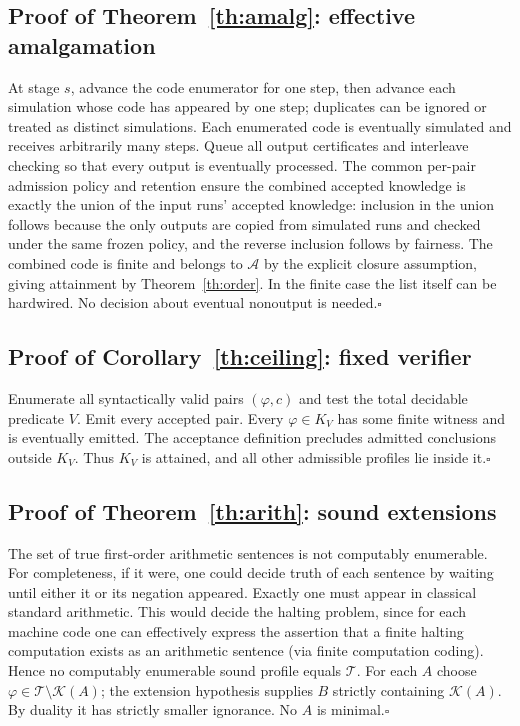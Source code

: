 \documentclass[11pt]{article}
\newcommand{\T}{\mathcal T}\newcommand{\K}{\mathcal K}\newcommand{\I}{\mathcal I}\newcommand{\A}{\mathcal A}
\begin{document}
\subsection{Proof of Theorem~\ref{th:amalg}: effective amalgamation}
At stage $s$, advance the code enumerator for one step, then advance each simulation whose code has appeared by one step; duplicates can be ignored or treated as distinct simulations. Each enumerated code is eventually simulated and receives arbitrarily many steps. Queue all output certificates and interleave checking so that every output is eventually processed. The common per-pair admission policy and retention ensure the combined accepted knowledge is exactly the union of the input runs' accepted knowledge: inclusion in the union follows because the only outputs are copied from simulated runs and checked under the same frozen policy, and the reverse inclusion follows by fairness. The combined code is finite and belongs to $\A$ by the explicit closure assumption, giving attainment by Theorem~\ref{th:order}. In the finite case the list itself can be hardwired. No decision about eventual nonoutput is needed.\hfill$\square$

\subsection{Proof of Corollary~\ref{th:ceiling}: fixed verifier}
Enumerate all syntactically valid pairs $(\varphi,c)$ and test the total decidable predicate $V$. Emit every accepted pair. Every $\varphi\in K_V$ has some finite witness and is eventually emitted. The acceptance definition precludes admitted conclusions outside $K_V$. Thus $K_V$ is attained, and all other admissible profiles lie inside it.\hfill$\square$

\subsection{Proof of Theorem~\ref{th:arith}: sound extensions}
The set of true first-order arithmetic sentences is not computably enumerable. For completeness, if it were, one could decide truth of each sentence by waiting until either it or its negation appeared. Exactly one must appear in classical standard arithmetic. This would decide the halting problem, since for each machine code one can effectively express the assertion that a finite halting computation exists as an arithmetic sentence (via finite computation coding). Hence no computably enumerable sound profile equals $\T$. For each $A$ choose $\varphi\in\T\setminus\K(A)$; the extension hypothesis supplies $B$ strictly containing $\K(A)$. By duality it has strictly smaller ignorance. No $A$ is minimal.\hfill$\square$
\end{document}
